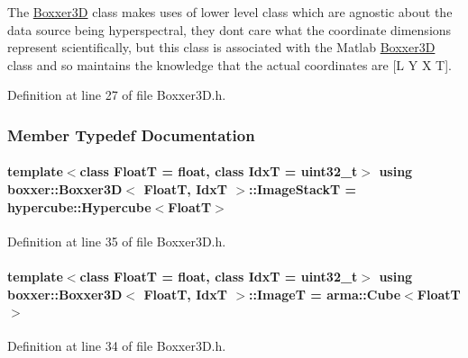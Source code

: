 The \hyperlink{classboxxer_1_1Boxxer3D}{Boxxer3D} class makes uses of lower level class which are agnostic about the data source being hyperspectral, they don\textquotesingle{}t care what the coordinate dimensions represent scientifically, but this class is associated with the Matlab \hyperlink{classboxxer_1_1Boxxer3D}{Boxxer3D} class and so maintains the knowledge that the actual coordinates are \mbox{[}L Y X T\mbox{]}. 

Definition at line 27 of file Boxxer3\+D.\+h.



\subsubsection{Member Typedef Documentation}
\paragraph[{\texorpdfstring{Image\+StackT}{ImageStackT}}]{\setlength{\rightskip}{0pt plus 5cm}template$<$class FloatT  = float, class IdxT  = uint32\+\_\+t$>$ using {\bf boxxer\+::\+Boxxer3D}$<$ FloatT, IdxT $>$\+::{\bf Image\+StackT} =  hypercube\+::\+Hypercube$<$FloatT$>$}\hypertarget{classboxxer_1_1Boxxer3D_aa17e25866089479e9b40ea01dfad8a88}{}\label{classboxxer_1_1Boxxer3D_aa17e25866089479e9b40ea01dfad8a88}


Definition at line 35 of file Boxxer3\+D.\+h.

\paragraph[{\texorpdfstring{ImageT}{ImageT}}]{\setlength{\rightskip}{0pt plus 5cm}template$<$class FloatT  = float, class IdxT  = uint32\+\_\+t$>$ using {\bf boxxer\+::\+Boxxer3D}$<$ FloatT, IdxT $>$\+::{\bf ImageT} =  arma\+::\+Cube$<$FloatT$>$}\hypertarget{classboxxer_1_1Boxxer3D_a8990923b1207fc8ae066de124ab75053}{}\label{classboxxer_1_1Boxxer3D_a8990923b1207fc8ae066de124ab75053}


Definition at line 34 of file Boxxer3\+D.\+h.


